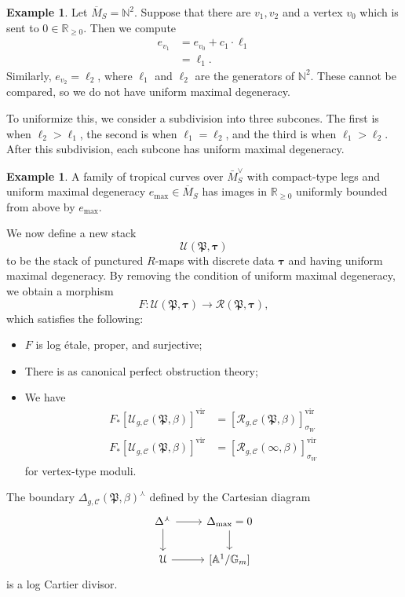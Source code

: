 \documentclass[10pt]{amsart}
\theoremstyle{definition}
\newtheorem{exm}[thm]{Example}
\theoremstyle{remark}
\theoremstyle{plain}
\theoremstyle{definition}
\theoremstyle{remark}
\newcommand{\A}{\mathbb{A}}
\newcommand{\G}{\mathbb{G}}
\newcommand{\N}{\mathbb{N}}
\newcommand{\R}{\mathbb{R}}
\newcommand{\mc}[1]{\mathcal{#1}}
\newcommand{\mf}[1]{\mathfrak{#1}}
\newcommand{\btau}{\bm{\tau}}
\newcommand{\mr}[1]{\mathrm{#1}}
\newcommand{\ol}[1]{\overline{#1}}
\newcommand{\1}{\mathbf{1}}
\newcommand{\2}{\mathbf{2}}
\newcommand{\3}{\mathbf{3}}
\newcommand{\vir}{\mr{vir}}
\begin{document}
\begin{exm}
    Let $\ol{M}_S = \N^2$. Suppose that there are $v_1, v_2$ and a vertex $v_0$ which is sent to $0 \in \R_{\geq 0}$. Then we compute
    \begin{align*}
        e_{v_1} &= e_{v_0} + c_1 \cdot \ell_1 \\
        &= \ell_1.
    \end{align*}
    Similarly, $e_{v_2} = \ell_2$, where $\ell_1$ and $\ell_2$ are the generators of $\N^2$. These cannot be compared, so we do not have uniform maximal degeneracy.

    To uniformize this, we consider a subdivision into three subcones. The first is when $\ell_2 > \ell_1$, the second is when $\ell_1 = \ell_2$, and the third is when $\ell_1 > \ell_2$. After this subdivision, each subcone has uniform maximal degeneracy.
\end{exm}

\begin{exm}
    A family of tropical curves over $\bar{M}_S^{\vee}$ with compact-type legs and uniform maximal degeneracy $e_{\max} \in \ol{M}_S$ has images in $\R_{\geq 0}$ uniformly bounded from above by $e_{\max}$.
\end{exm}

We now define a new stack
\[ \mc{U}(\mf{P}, \btau) \]
to be the stack of punctured $R$-maps with discrete data $\btau$ and having uniform maximal degeneracy. By removing the condition of uniform maximal degeneracy, we obtain a morphism
\[ F \colon \mc{U}(\mf{P}, \btau) \to \mc{R}(\mf{P}, \btau), \]
which satisfies the following:
\begin{itemize}
    \item $F$ is log \'etale, proper, and surjective;
    \item There is as canonical perfect obstruction theory;
    \item We have
        \begin{align*}
            F_* [ \mc{U}_{g, \mc{C}}(\mf{P}, \beta) ]^{\vir} &= [\mc{R}_{g,\mc{C}}(\mf{P}, \beta) ]^{\vir}_{\sigma_W} \\
            F_* [ \mc{U}_{g, \mc{C}}(\mf{P}, \beta) ]^{\vir} &= [\mc{R}_{g,\mc{C}}(\infty, \beta) ]^{\vir}_{\sigma_W}
        \end{align*}
        for vertex-type moduli.
\end{itemize}

The boundary $\Delta_{g, \mc{C}}(\mf{P}, \beta)^{\curlywedge}$ defined by the Cartesian diagram
\begin{equation*}
\begin{tikzcd}
    \Delta^{\curlywedge} \ar{r} \ar{d} & \Delta_{\max} = 0 \ar{d} \\
    \mc{U} \ar{r} & { [\A^1/\G_m] }
\end{tikzcd}
\end{equation*}
is a log Cartier divisor.
\end{document}
